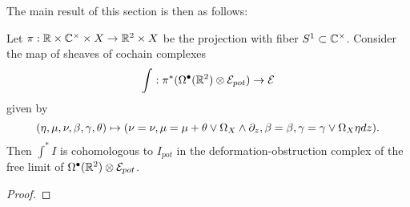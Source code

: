 The main result of this section is then as follows:

\begin{prop}
Let $\pi : \mathbb{R}\times \mathbb{C}^{\times}\times X \to \mathbb{R}^{2}\times X$ be the projection with fiber $S^{1}\subset \mathbb{C}^{\times}$. Consider the map of sheaves of cochain complexes \[\int : \pi^{*}(\Omega^{\bullet}(\mathbb{R}^{2})\otimes \mathcal E_{pot})\to \mathcal E\] given by \[(\eta, \mu, \nu, \beta,\gamma,\theta)\mapsto (\nu = \nu, \mu = \mu + \theta \vee \Omega_{X} \wedge\partial_{z}, \beta = \beta, \gamma = \gamma\vee \Omega_{X} \eta dz ).\] Then $\int^{*} I$ is cohomologous to $I_{pot}$ in the deformation-obstruction complex of the free limit of $\Omega^{\bullet}(\mathbb{R}^{2})\otimes \mathcal E_{pot}$.
\end{prop}
\begin{proof}
\end{proof}
